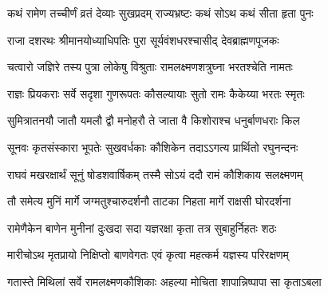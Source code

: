 

\storymeta





\twolineshloka
{कथं रामेण तच्चीर्णं व्रतं देव्याः सुखप्रदम्}
{राज्यभ्रष्टः कथं सोऽथ कथं सीता हृता पुनः}%



\twolineshloka
{राजा दशरथः श्रीमानयोध्याधिपतिः पुरा}
{सूर्यवंशधरश्चासीद् देवब्राह्मणपूजकः}%

\twolineshloka
{चत्वारो जज्ञिरे तस्य पुत्रा लोकेषु विश्रुताः}
{रामलक्ष्मणशत्रुघ्ना भरतश्चेति नामतः}%

\twolineshloka
{राज्ञः प्रियकराः सर्वे सदृशा गुणरूपतः}
{कौसल्यायाः सुतो रामः कैकेय्या भरतः स्मृतः}%

\twolineshloka
{सुमित्रातनयौ जातौ यमलौ द्वौ मनोहरौ}
{ते जाता वै किशोराश्च धनुर्बाणधराः किल}%

\twolineshloka
{सूनवः कृतसंस्कारा भूपतेः सुखवर्धकाः}
{कौशिकेन तदाऽऽगत्य प्रार्थितो रघुनन्दनः}%

\twolineshloka
{राघवं मखरक्षार्थं सूनुं षोडशवार्षिकम्}
{तस्मै सोऽयं ददौ रामं कौशिकाय सलक्ष्मणम्}%

\twolineshloka
{तौ समेत्य मुनिं मार्गे जग्मतुश्चारुदर्शनौ}
{ताटका निहता मार्गे राक्षसी घोरदर्शना}%

\twolineshloka
{रामेणैकेन बाणेन मुनीनां दुःखदा सदा}
{यज्ञरक्षा कृता तत्र सुबाहुर्निहतः शठः}%

\twolineshloka
{मारीचोऽथ मृतप्रायो निक्षिप्तो बाणवेगतः}
{एवं कृत्वा महत्कर्म यज्ञस्य परिरक्षणम्}%

\twolineshloka
{गतास्ते मिथिलां सर्वे रामलक्ष्मणकौशिकाः}
{अहल्या मोचिता शापान्निष्पापा सा कृताऽबला}%

